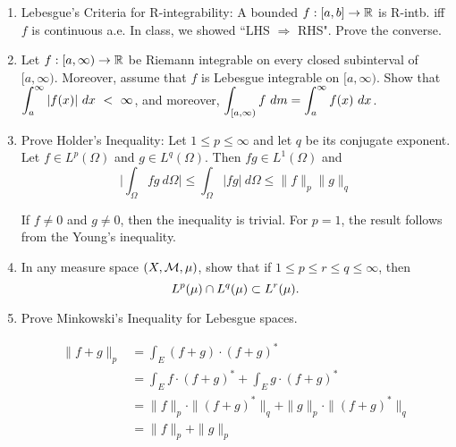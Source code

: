 \documentclass[12pt]{article}
\begin{document}
\begin{enumerate}



\item Lebesgue's Criteria for R-integrability: A bounded $f:[a,b] \to \mathbb{R}$
    is R-intb. iff $f$ is continuous a.e. In class, we showed
    ``LHS $\Rightarrow$ RHS". Prove the converse.
\begin{mybox}

\end{mybox}

\item Let $f: [a,\infty) \to \mathbb{R}$ be Riemann integrable on every closed subinterval of $[a, \infty)$. Moreover, assume that $f$ is Lebesgue integrable on $[a, \infty)$. Show that \\
$\ds \int_a^{\infty} |f(x)| \ dx \ < \ \infty$, and moreover,  $\displaystyle \int_{[a, \infty)}f \ dm = \int_a^{\infty} f(x) \ dx$. 
\begin{mybox}

\end{mybox}

\item Prove Holder's Inequality: Let $1 \leq p \leq \infty$ and let $q$ be its conjugate exponent. Let $f \in L^p(\Omega)$ and $g \in L^q(\Omega)$. Then $fg \in L^1(\Omega)$ and 
$$\Big| \int_{\Omega} fg \ d\Omega \Big| \leq \int_{\Omega} |fg| \ d\Omega \leq \|f\|_p \|g\|_q$$
\begin{mybox}

    If $f\neq 0$ and $g\neq 0$, then the inequality is trivial.
    For $p=1$, the result follows from the Young's inequality.
\end{mybox}

\item In any measure space $(X, \mathcal{M}, \mu)$, show that if $1 \leq p \leq r \leq  q \leq \infty$, then $$L^p(\mu) \cap L^q(\mu) \subset L^r(\mu).$$
\begin{mybox}

\end{mybox}

\item Prove Minkowski's Inequality for Lebesgue spaces.
\begin{mybox}

    \begin{align*}
        \|f+g\|_p&=\int_{E}{(f+g)\cdot(f+g)^*}\\
        &=\int_{E}{f\cdot(f+g)^*}+\int_{E}{g\cdot(f+g)^*}\\
        &=\|f\|_p\cdot\|(f+g)^*\|_q+\|g\|_p\cdot\|(f+g)^*\|_q\\
        &=\|f\|_p+\|g\|_p
    \end{align*}
\end{mybox}


\end{enumerate}
\end{document}
